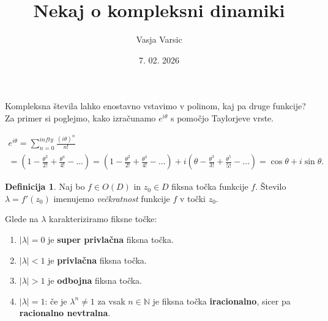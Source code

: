 \documentclass{beamer}
\title{Nekaj o kompleksni dinamiki}
\author{Vasja Varsic}
\date{7. 02. 2026}
\institute{Fakulteta za matematiko in fiziko}
\theoremstyle{definition}
\newtheorem{definicija}{Definicija}
\begin{document}
\begin{frame}
    \titlepage
\end{frame}


\begin{frame}
    Kompleksna števila lahko enostavno vstavimo v polinom, kaj pa druge funkcije? 
    Za primer si poglejmo, kako izračunamo $e^{i\theta}$ s pomočjo Taylorjeve vrste.
    
    \begin{align*}
        e^{i\theta}= \sum_{n=0}^{infty} \frac{(i\theta)^n}{n!} \\
        = \left( 1 - \frac{\theta^2}{2!} + \frac{\theta^4}{4!} - \ldots \right)
        = \left( 1 - \frac{\theta^2}{2!} + \frac{\theta^4}{4!} - \ldots \right) 
          + i \left(\theta - \frac{\theta^3}{3!} + \frac{\theta^5}{5!} - \ldots \right)
        = \cos\theta + i\sin\theta.
    \end{align*}
    \end{frame}

\begin{frame}

    \begin{definicija}
        Naj bo $f \in O(D)$ in $z_0 \in D$ fiksna točka funkcije $f$.
        Število $\lambda = f'(z_0)$ imenujemo \emph{večkratnost} funkcije $f$ v točki $z_0$.
    \end{definicija}
    

    \begin{exampleblock}{Glede na $\lambda$ karakteriziramo fiksne točke:}
        \begin{enumerate} [<+->]
            \item $|\lambda| = 0$ je \textbf{super privlačna} fiksna točka.
            \item $|\lambda| < 1$ je \textbf{privlačna} fiksna točka.
            \item $|\lambda| > 1$ je \textbf{odbojna} fiksna točka.
            \item $|\lambda| = 1$: 
                če je $\lambda^n \neq 1$ za vsak $n \in \mathbb{N}$ je fiksna točka \textbf{iracionalno},
                sicer pa \textbf{racionalno nevtralna}.
        \end{enumerate}
    \end{exampleblock}
\end{frame}
\end{document}

